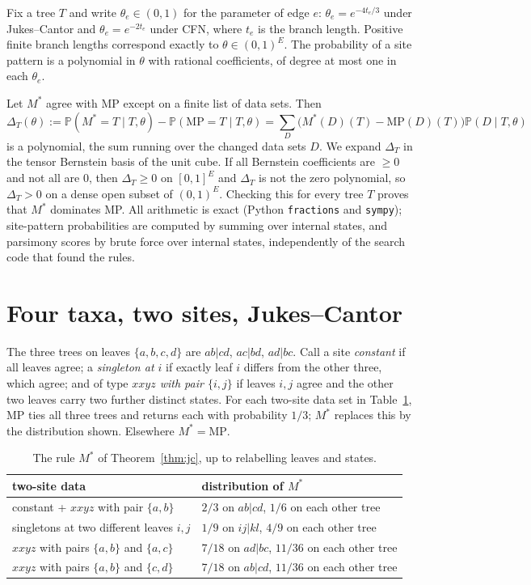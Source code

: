 \documentclass[11pt]{amsart}
\theoremstyle{definition}
\theoremstyle{remark}
\newcommand{\MP}{\mathrm{MP}}
\newcommand{\Prob}{\mathbb{P}}
\begin{document}
Fix a tree $T$ and write $\theta_e\in(0,1)$ for the parameter of edge $e$: $\theta_e=e^{-4t_e/3}$ under Jukes--Cantor and $\theta_e=e^{-2t_e}$ under CFN, where $t_e$ is the branch length. Positive finite branch lengths correspond exactly to $\theta\in(0,1)^E$. The probability of a site pattern is a polynomial in $\theta$ with rational coefficients, of degree at most one in each $\theta_e$.

Let $M^\ast$ agree with MP except on a finite list of data sets. Then
\[
\Delta_T(\theta):=\Prob(M^\ast=T\mid T,\theta)-\Prob(\MP=T\mid T,\theta)=\sum_{D}\bigl(M^\ast(D)(T)-\MP(D)(T)\bigr)\Prob(D\mid T,\theta)
\]
is a polynomial, the sum running over the changed data sets $D$. We expand $\Delta_T$ in the tensor Bernstein basis of the unit cube. If all Bernstein coefficients are $\ge0$ and not all are $0$, then $\Delta_T\ge0$ on $[0,1]^E$ and $\Delta_T$ is not the zero polynomial, so $\Delta_T>0$ on a dense open subset of $(0,1)^E$. Checking this for every tree $T$ proves that $M^\ast$ dominates MP. All arithmetic is exact (Python \texttt{fractions} and \texttt{sympy}); site-pattern probabilities are computed by summing over internal states, and parsimony scores by brute force over internal states, independently of the search code that found the rules.

\section{Four taxa, two sites, Jukes--Cantor}\label{sec:jc}

The three trees on leaves $\{a,b,c,d\}$ are $ab|cd$, $ac|bd$, $ad|bc$. Call a site \emph{constant} if all leaves agree; a \emph{singleton at $i$} if exactly leaf $i$ differs from the other three, which agree; and of type \emph{$xxyz$ with pair $\{i,j\}$} if leaves $i,j$ agree and the other two leaves carry two further distinct states. For each two-site data set in Table~\ref{tab:jc}, MP ties all three trees and returns each with probability $1/3$; $M^\ast$ replaces this by the distribution shown. Elsewhere $M^\ast=\MP$.

\begin{table}[h]
\centering
\begin{tabular}{@{}ll@{}}
\toprule
two-site data & distribution of $M^\ast$\\
\midrule
constant + $xxyz$ with pair $\{a,b\}$ & $2/3$ on $ab|cd$, $1/6$ on each other tree\\
singletons at two different leaves $i,j$ & $1/9$ on $ij|kl$, $4/9$ on each other tree\\
$xxyz$ with pairs $\{a,b\}$ and $\{a,c\}$ & $7/18$ on $ad|bc$, $11/36$ on each other tree\\
$xxyz$ with pairs $\{a,b\}$ and $\{c,d\}$ & $7/18$ on $ab|cd$, $11/36$ on each other tree\\
\bottomrule
\end{tabular}
\caption{The rule $M^\ast$ of Theorem~\ref{thm:jc}, up to relabelling leaves and states.}\label{tab:jc}
\end{table}
\end{document}
